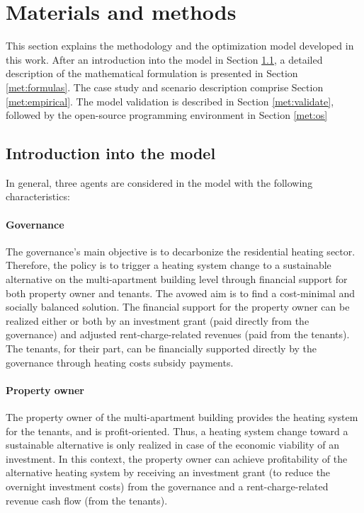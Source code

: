 \section{Materials and methods}\label{methodology}
This section explains the methodology and the optimization model developed in this work. After an introduction into the model in Section \ref{met:intro}, a detailed description of the mathematical formulation is presented in Section \ref{met:formulas}. The case study and scenario description comprise Section \ref{met:empirical}. The model validation is described in Section \ref{met:validate}, followed by the open-source programming environment in Section \ref{met:os}

\subsection{Introduction into the model}\label{met:intro}
In general, three agents are considered in the model with the following characteristics:
\paragraph{Governance} The governance's main objective is to decarbonize the residential heating sector. Therefore, the policy is to trigger a heating system change to a sustainable alternative on the multi-apartment building level through financial support for both property owner and tenants. The avowed aim is to find a cost-minimal and socially balanced solution. The financial support for the property owner can be realized either or both by an investment grant (paid directly from the governance) and adjusted rent-charge-related revenues (paid from the tenants). The tenants, for their part, can be financially supported directly by the governance through heating costs subsidy payments. 
\paragraph{Property owner} The property owner of the multi-apartment building provides the heating system for the tenants, and is profit-oriented. Thus, a heating system change toward a sustainable alternative is only realized in case of the economic viability of an investment. In this context, the property owner can achieve profitability of the alternative heating system by receiving an investment grant (to reduce the overnight investment costs) from the governance and a rent-charge-related revenue cash flow (from the tenants). 
